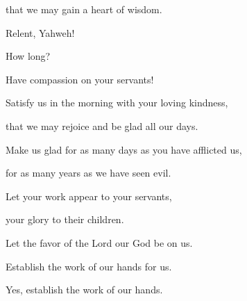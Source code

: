 {\par }{\QB that we may gain a heart of wisdom.
\par }{\Q {}Relent, Yahweh!
\par }{\QB How long?
\par }{\QB Have compassion on your servants!
\par }{\Q {}Satisfy us in the morning with your loving kindness,
\par }{\QB that we may rejoice and be glad all our days.
\par }{\Q {}Make us glad for as many days as you have afflicted us,
\par }{\QB for as many years as we have seen evil.
\par }{\Q {}Let your work appear to your servants,
\par }{\QB your glory to their children.
\par }{\Q {}Let the favor of the Lord our God be on us.
\par }{\QB Establish the work of our hands for us.
\par }{\QB Yes, establish the work of our hands.

}

